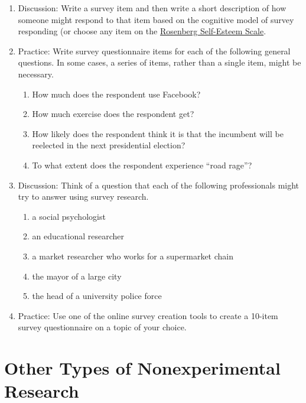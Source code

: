 \documentclass[
]{krantz}
\providecommand{\tightlist}{%
  \setlength{\itemsep}{0pt}\setlength{\parskip}{0pt}}
\begin{document}
\begin{enumerate}
\def\labelenumi{\arabic{enumi}.}
\tightlist
\item
  Discussion: Write a survey item and then write a short description of how someone might respond to that item based on the cognitive model of survey responding (or choose any item on the \href{https://socy.umd.edu/about-us/using-rosenberg-self-esteem-scale}{Rosenberg Self-Esteem Scale}.
\item
  Practice: Write survey questionnaire items for each of the following general questions. In some cases, a series of items, rather than a single item, might be necessary.

  \begin{enumerate}
  \def\labelenumii{\alph{enumii}.}
  \tightlist
  \item
    How much does the respondent use Facebook?
  \item
    How much exercise does the respondent get?
  \item
    How likely does the respondent think it is that the incumbent will be reelected in the next presidential election?
  \item
    To what extent does the respondent experience ``road rage''?
  \end{enumerate}
\item
  Discussion: Think of a question that each of the following professionals might try to answer using survey research.

  \begin{enumerate}
  \def\labelenumii{\alph{enumii}.}
  \tightlist
  \item
    a social psychologist
  \item
    an educational researcher
  \item
    a market researcher who works for a supermarket chain
  \item
    the mayor of a large city
  \item
    the head of a university police force
  \end{enumerate}
\item
  Practice: Use one of the online survey creation tools to create a 10-item survey questionnaire on a topic of your choice.
\end{enumerate}

\section{Other Types of Nonexperimental Research}\label{other-types-of-nonexperimental-research}
\end{document}

